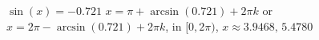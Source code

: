  {$\sin(x) = -0.721$}
{ $x = \pi + \arcsin(0.721) + 2\pi k$ or $x = 2\pi - \arcsin(0.721) + 2\pi k$, in  $[0, 2\pi)$, $x \approx 3.9468, \, 5.4780$}
